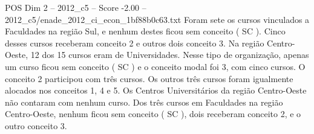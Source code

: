 \begin{textsample}{POS Dim 2 – 2012\_c5 – Score -2.00 – 2012\_c5/enade\_2012\_ci\_econ\_1bf88b0c63.txt}
Foram sete os cursos vinculados a Faculdades na região Sul, e nenhum destes ficou sem conceito ( SC ).
Cinco desses cursos receberam conceito 2 e outros dois conceito 3.
Na região Centro-Oeste, 12 dos 15 cursos eram de Universidades.
Nesse tipo de organização, apenas um curso ficou sem conceito ( SC ) e o conceito modal foi 3, com cinco cursos.
O conceito 2 participou com três cursos.
Os outros três cursos foram igualmente alocados nos conceitos 1, 4 e 5.
Os Centros Universitários da região Centro-Oeste não contaram com nenhum curso.
Dos três cursos em Faculdades na região Centro-Oeste, nenhum ficou sem conceito ( SC ), dois receberam conceito 2, e o outro conceito 3.

\end{textsample}
